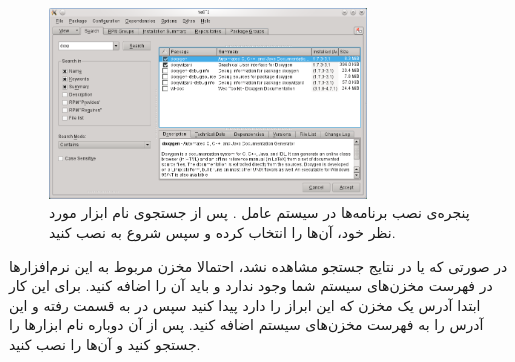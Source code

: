 \begin{figure}
 \centering
\includegraphics[width=0.75\textwidth]{image/install/OpenSUSE/setup}
\caption[پنجره‌ی نصب برنامه‌ها در سیستم عامل .]{
پنجره‌ی نصب برنامه‌ها در سیستم عامل . پس از جستجوی نام ابزار مورد
نظر خود، آن‌ها را انتخاب کرده و سپس شروع به نصب کنید.
}
\label{image/install/OpenSUSE/setup}
\end{figure}

در صورتی که  یا  در نتایج جستجو مشاهده نشد، احتمالا
مخزن مربوط به این نرم‌افزارها در فهرست مخزن‌های سیستم شما وجود ندارد و باید آن
را اضافه کنید. برای این کار ابتدا آدرس یک مخزن که این ابراز را دارد پیدا کنید
سپس در  به قسمت  رفته و این آدرس را به فهرست
مخزن‌های سیستم اضافه کنید. پس از آن دوباره نام ابزارها را جستجو کنید و آن‌ها را
نصب کنید.

